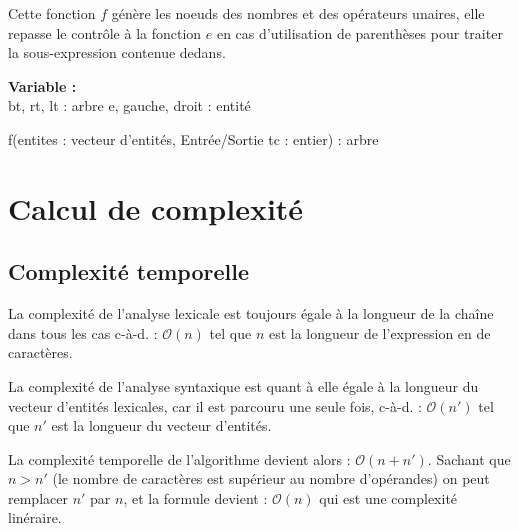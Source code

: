 \par
Cette fonction $f$ génère les noeuds des nombres et des opérateurs unaires, elle repasse le contrôle à la fonction $e$ en cas d'utilisation de parenthèses pour traiter la sous-expression contenue dedans.\\
\begin{function}[H]
    \textbf{Variable :}\\
    bt, rt, lt : arbre\;
    e, gauche, droit : entité\;
    \caption{f(entites : vecteur d'entités, Entrée/Sortie tc : entier) : arbre}
\end{function}

\section{Calcul de complexité}
\subsection{Complexité temporelle}
La complexité de l'analyse lexicale est toujours égale à la longueur de la chaîne dans tous les cas c-à-d. : $\mathcal{O}(n)$ tel que $n$ est la longueur de l'expression en de caractères.
\par
La complexité de l'analyse syntaxique est quant à elle égale à la longueur du vecteur d'entités lexicales, car il est parcouru une seule fois, c-à-d. : $\mathcal{O}(n')$ tel que $n'$ est la longueur du vecteur d'entités.
\par
La complexité temporelle de l'algorithme devient alors : $\mathcal{O}(n + n')$. Sachant que $n > n'$ (le nombre de caractères est supérieur au nombre d'opérandes) on peut remplacer $n'$ par $n$, et la formule devient : $\mathcal{O}(n)$ qui est une complexité linéraire.

